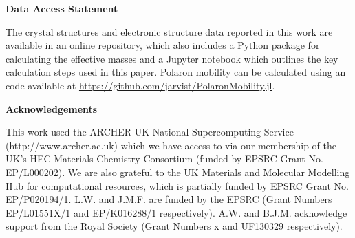 \textbf{Data Access Statement}

The crystal structures and electronic structure data reported in this work are available 
in an online repository,\autocite{Whalley2018} 
which also includes a Python package for calculating the effective masses and a Jupyter notebook which outlines the key calculation steps used in this paper.
Polaron mobility can be calculated using an code available at \url{https://github.com/jarvist/PolaronMobility.jl}.

\textbf{Acknowledgements}

This work used the ARCHER UK National Supercomputing Service \\ (http://www.archer.ac.uk) which we have access to via our membership of the UK's HEC Materials Chemistry Consortium (funded by EPSRC Grant No. EP/L000202). We are also grateful to the UK Materials and Molecular Modelling Hub for computational resources, which is partially funded by EPSRC Grant No. EP/P020194/1. L.W. and J.M.F. are funded by the EPSRC (Grant Numbers EP/L01551X/1 and EP/K016288/1 respectively). A.W. and B.J.M. acknowledge support from the Royal Society (Grant Numbers x and UF130329 respectively).